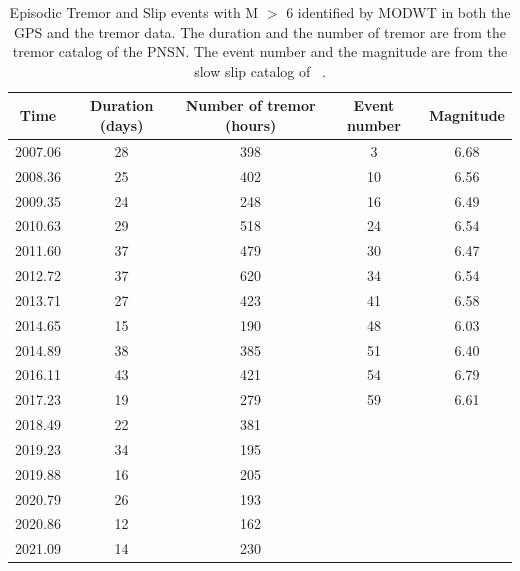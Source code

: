 \documentclass{article}
\begin{document}
\begin{table}[hbt!]
\caption{Episodic Tremor and Slip events with M $>$ 6 identified by MODWT in both the GPS and the tremor data. The duration and the number of tremor are from the tremor catalog of the PNSN. The event number and the magnitude are from the slow slip catalog of ~\citet{MIC_2019}.}
 \centering
 \begin{tabular}{c c c c c}
 \hline
 Time & Duration (days) & Number of tremor (hours) & Event number & Magnitude \\
 \hline
 2007.06 & 28 & 398 & 3 & 6.68 \\
 2008.36 & 25 & 402 & 10 & 6.56 \\
 2009.35 & 24 & 248 & 16 & 6.49 \\
 2010.63 & 29 & 518 & 24 & 6.54 \\
 2011.60 & 37 & 479 & 30 & 6.47 \\
 2012.72 & 37 & 620 & 34 & 6.54 \\
 2013.71 & 27 & 423 & 41 & 6.58 \\
 2014.65 & 15 & 190 & 48 & 6.03 \\
 2014.89 & 38 & 385 & 51 & 6.40 \\
 2016.11 & 43 & 421 & 54 & 6.79 \\
 2017.23 & 19 & 279 & 59 & 6.61 \\
 2018.49 & 22 & 381 & & \\
 2019.23 & 34 & 195 & & \\
 2019.88 & 16 & 205 & & \\
 2020.79 & 26 & 193 & & \\
 2020.86 & 12 & 162 & & \\
 2021.09 & 14 & 230 & & \\
 \hline
 \end{tabular}
 \end{table}
\end{document}
